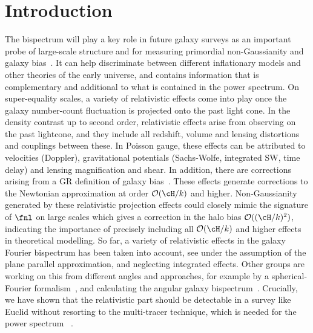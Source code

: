\section{Introduction}
The bispectrum will play a key role in future galaxy surveys as an  important probe of large-scale structure and for measuring primordial 
non-Gaussianity and galaxy bias~\cite{Jeong:2009vd,Baldauf:2010vn,Celoria:2018euj}. It can help discriminate between different inflationary models and other theories of the early universe, and contains information that is complementary and additional to what is contained in the power spectrum. 
On super-equality scales, a variety of relativistic effects come into play once the galaxy number-count fluctuation is projected onto the past light cone. In the density contrast up to second order, relativistic effects arise from observing on the past lightcone, and they include all redshift, volume and lensing distortions and couplings between these. In Poisson gauge, these effects can be attributed to velocities (Doppler), gravitational potentials (Sachs-Wolfe, integrated SW, time delay) and lensing magnification and shear. In addition, there are corrections arising from a GR definition of galaxy bias~\cite{Bertacca:2014wga}. These effects generate corrections to the Newtonian approximation at order $\mathcal{O}(\cH/k)$ and higher. Non-Gaussianity generated by these relativistic projection effects could closely mimic the signature of \(\fnl\) on large scales which gives a correction in the halo bias $\mathcal{O}((\cH/k)^2)$, indicating the importance of precisely including all $\mathcal{O}(\cH/k)$ and higher effects in theoretical modelling. So far, a variety of relativistic effects in the galaxy Fourier bispectrum has been taken into account, see 
\cite{Umeh:2016nuh,Jolicoeur:2017nyt,Jolicoeur:2017eyi,Jolicoeur:2018blf,Clarkson:2018dwn,Maartens:2019yhx} under the assumption of the plane parallel approximation, and neglecting integrated effects. Other groups are working on this from different angles and approaches, for example by a spherical-Fourier formalism~\cite{Bertacca:2017dzm}, and calculating the angular galaxy bispectrum~\cite{DiDio:2016gpd,DiDio:2018unb}. Crucially, we have shown that the relativistic part should be detectable in a survey like Euclid without resorting to the multi-tracer technique, which is needed for the power spectrum~\cite{Maartens:2019yhx} . 

